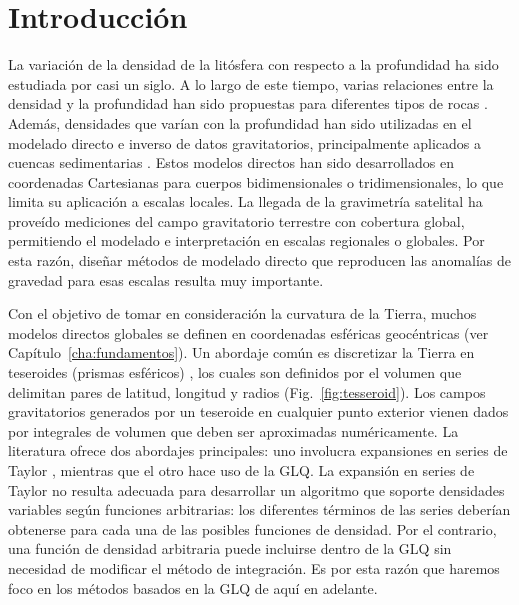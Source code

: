 \section{Introducción}

La variación de la densidad de la litósfera con respecto a la profundidad ha
sido estudiada por casi un siglo.
A lo largo de este tiempo, varias relaciones entre la densidad y la profundidad
han sido propuestas para diferentes tipos de rocas
\citep[por ejemplo~][]{maxant1980, rao1986, rao1993, rao1994}.
Además, densidades que varían con la profundidad han sido utilizadas en el
modelado directo e inverso de datos gravitatorios, principalmente aplicados
a cuencas sedimentarias
\citep{cordell1973, rao1986, cowie1990, rao1993, rao1994, zhang2001,
welford2010}.
Estos modelos directos han sido desarrollados en coordenadas Cartesianas para
cuerpos bidimensionales o tridimensionales, lo que limita su aplicación
a escalas locales.
La llegada de la gravimetría satelital ha proveído mediciones del campo
gravitatorio terrestre con cobertura global, permitiendo el modelado
e interpretación en escalas regionales o globales.
Por esta razón, diseñar métodos de modelado directo que reproducen las
anomalías de gravedad para esas escalas resulta muy importante.

Con el objetivo de tomar en consideración la curvatura de la Tierra, muchos
modelos directos globales se definen en coordenadas esféricas geocéntricas
(ver Capítulo~\ref{cha:fundamentos}).
Un abordaje común es discretizar la Tierra en teseroides (prismas esféricos)
\citep{anderson1976}, los cuales son definidos por el volumen que delimitan
pares de latitud, longitud y radios (Fig.~\ref{fig:tesseroid}).
Los campos gravitatorios generados por un teseroide en cualquier punto
exterior vienen dados por integrales de volumen que deben ser aproximadas
numéricamente.
La literatura ofrece dos abordajes principales: uno involucra expansiones en
series de Taylor \citep{heck2006, grombein2013}, mientras que el otro hace uso
de la \ac{GLQ}.
La expansión en series de Taylor no resulta adecuada para desarrollar un
algoritmo que soporte densidades variables según funciones arbitrarias: los
diferentes términos de las series deberían obtenerse para cada una de las
posibles funciones de densidad.
Por el contrario, una función de densidad arbitraria puede incluirse dentro de
la \ac{GLQ} sin necesidad de modificar el método de integración.
Es por esta razón que haremos foco en los métodos basados en la \ac{GLQ} de
aquí en adelante.


